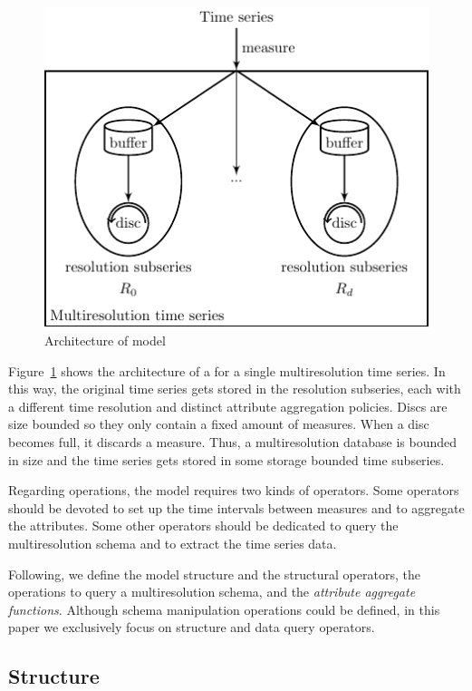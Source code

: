 \begin{figure}
  \centering
  \includegraphics{fig_model_mtsdb.pdf}
  \caption{Architecture of  model}
  \label{fig:model:mtsdb}
\end{figure}

Figure~\ref{fig:model:mtsdb} shows the architecture of a 
for a single multiresolution time series. In this way, the original
time series gets stored in the resolution subseries, each with a
different time resolution and distinct attribute aggregation
policies. Discs are size bounded so they only contain a fixed amount
of measures. When a disc becomes full, it discards a measure. Thus, a
multiresolution database is bounded in size and the time series gets
stored in some storage bounded time subseries.

Regarding operations, the  model requires two kinds of
operators. Some operators should be devoted to set up the time
intervals between measures and to aggregate the attributes. Some other
operators should be dedicated to query the multiresolution schema and
to extract the time series data.

Following, we define the  model structure and the
structural operators, the operations to query a multiresolution
schema, and the \emph{attribute aggregate functions}.  Although schema
manipulation operations could be defined, in this paper we exclusively
focus on structure and data query operators.


\subsection{Structure}


